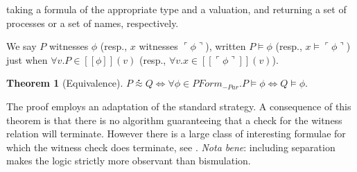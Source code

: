 \documentclass[submission,copyright,creativecommons]{eptcs}
\makeatletter
\newcommand{\ldb}{[\![}
\newcommand{\rdb}{]\!]}
\newcommand{\ldrb}{(\!(}
\newcommand{\rdrb}{)\!)}
\newcommand{\lpquote}{\ulcorner}
\newcommand{\rpquote}{\urcorner}
\newcommand{\id}[1]{\texttt{#1}}
\newcommand{\pzero}{\mathbin{0}}
\newcommand{\juxtap}{\mathbin{\id{|}}}
\newcommand{\concat}{\Rightarrow}
\newcommand{\scong}{\mathbin{\equiv}}
\newcommand{\nameeq}{\mathbin{\equiv_N}}
\newcommand{\binpar}[2]{#1 \juxtap #2}
\newcommand{\prefix}[3]{#1 ? ( #2 ) \concat #3}
\newcommand{\lift}[2]{#1 ! ( #2 )}
\newcommand{\quotep}[1]{@#1}
\newcommand{\dropn}[1]{*#1}
\newcommand{\substn}[2]{\id{\{} #1 / #2 \id{\}}}
\newcommand{\meaningof}[1]{\ldb #1 \rdb}
\newcommand{\pmeaningof}[1]{\ldb #1 \rdb}
\newcommand{\nmeaningof}[1]{\ldrb #1 \rdrb}
\newcommand{\Proc}{\mathbin{Proc}}
\newcommand{\defneqls}{\coloneqq}
\newcommand{\wbbisim}{\stackrel{\centerdot}{\approx}} %
\newcommand{\ptrue}{\mathbin{true}}
\newcommand{\pdropf}[1]{\rpquote #1 \lpquote}
\newcommand{\pquotep}[1]{\lpquote #1 \rpquote}
\newcommand{\plift}[2]{#1 ! ( #2 )}
\newcommand{\pprefix}[3]{\langle #1 ? #2 \rangle #3}
\newcommand{\pgfp}[2]{\textsf{rec} \; #1 \mathbin{.} #2}
\newcommand{\pquant}[3]{\forall #1 \mathbin{:} #2 \mathbin{.} #3}
\newcommand{\riff}{\Leftrightarrow}
\newcommand{\PFormula}{\mathbin{PForm}}
\newtheorem{thm}{Theorem}[subsection]
\numberwithin{equation}{subsection}
\makeatother
\begin{document}
\noindent taking a formula of the appropriate type and a valuation, and
returning a set of processes or a set of names, respectively.


We say $P$ witnesses $\phi$ (resp., $x$ witnesses $\pquotep{\phi}$),
written $P \models \phi$ (resp., $x \models \pquotep{\phi}$) just when
$\forall v . P \in \meaningof{\phi}(v)$ (resp., $\forall v . x \in \meaningof{\pquotep{\phi}}(v)$).

\begin{thm}[Equivalence]\label{sec:equivalence_theorem}
	$P \wbbisim Q \riff \forall \phi \in \PFormula_{-Par} . P \models \phi \riff Q \models \phi .$
\end{thm}

The proof employs an adaptation of the standard strategy. A
consequence of this theorem is that there is no algorithm guaranteeing
that a check for the witness relation will terminate. However there is
a large class of interesting formulae for which the witness check does
terminate, see \cite{DBLP:conf/fossacs/Caires04}. {\em Nota bene}:
including separation makes the logic strictly more observant than
bismulation.
\end{document}
